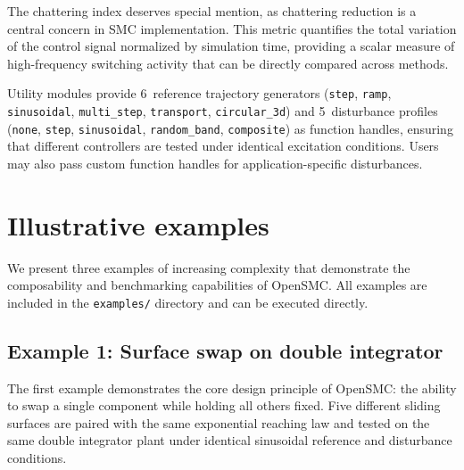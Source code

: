 \documentclass[preprint,12pt]{elsarticle}
\begin{document}
The chattering index deserves special mention, as chattering reduction is a central concern in SMC implementation. This metric quantifies the total variation of the control signal normalized by simulation time, providing a scalar measure of high-frequency switching activity that can be directly compared across methods.

Utility modules provide 6~reference trajectory generators (\texttt{step}, \texttt{ramp}, \texttt{sinusoidal}, \texttt{multi\_step}, \texttt{transport}, \texttt{circular\_3d}) and 5~disturbance profiles (\texttt{none}, \texttt{step}, \texttt{sinusoidal}, \texttt{random\_band}, \texttt{composite}) as function handles, ensuring that different controllers are tested under identical excitation conditions. Users may also pass custom function handles for application-specific disturbances.


\section{Illustrative examples}
\label{sec:examples}

We present three examples of increasing complexity that demonstrate the composability and benchmarking capabilities of OpenSMC. All examples are included in the \texttt{examples/} directory and can be executed directly.

\subsection{Example 1: Surface swap on double integrator}
\label{sec:ex1}

The first example demonstrates the core design principle of OpenSMC: the ability to swap a single component while holding all others fixed. Five different sliding surfaces are paired with the same exponential reaching law and tested on the same double integrator plant under identical sinusoidal reference and disturbance conditions.
\end{document}
